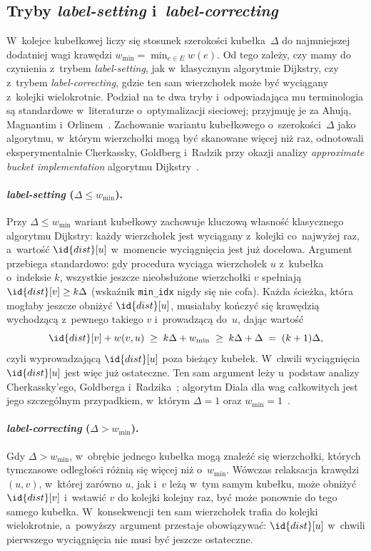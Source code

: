 \subsection{Tryby \emph{label-setting} i~\emph{label-correcting}}
\label{subsec:warianty:bucket:tryby}

W~kolejce kubełkowej liczy się stosunek szerokości
kubełka~$\Delta$ do najmniejszej dodatniej wagi krawędzi
$w_{\min}=\min_{e\in E}w(e)$. Od tego zależy, czy mamy do czynienia z~trybem
\emph{label-setting}, jak w~klasycznym algorytmie
Dijkstry, czy z~trybem \emph{label-correcting},
gdzie ten sam wierzchołek może być wyciągany z~kolejki wielokrotnie.
Podział na te dwa tryby i~odpowiadająca mu terminologia są standardowe
w~literaturze o~optymalizacji sieciowej; przyjmuję je za
Ahują, Magnantim i~Orlinem~\cite{ahuja1993network}.
Zachowanie wariantu kubełkowego o~szerokości~$\Delta$ jako algorytmu,
w~którym wierzchołki mogą być skanowane więcej niż raz, odnotowali
eksperymentalnie Cherkassky, Goldberg i~Radzik przy okazji analizy
\emph{approximate bucket implementation} algorytmu
Dijkstry~\cite{cherkassky1996}.

\paragraph{\emph{label-setting} ($\Delta\le w_{\min}$).}
Przy $\Delta\le w_{\min}$ wariant kubełkowy zachowuje kluczową własność
klasycznego algorytmu Dijkstry: każdy wierzchołek jest wyciągany z~kolejki
co~najwyżej raz, a~wartość $\id{dist}[u]$ w~momencie wyciągnięcia jest już
docelowa. Argument przebiega standardowo: gdy procedura wyciąga wierzchołek
$u$ z~kubełka o~indeksie $k$, wszystkie jeszcze nieobsłużone wierzchołki $v$
spełniają $\id{dist}[v]\ge k\Delta$ (wskaźnik \texttt{min\_idx} nigdy się nie
cofa). Każda ścieżka, która mogłaby jeszcze obniżyć $\id{dist}[u]$, musiałaby kończyć
się krawędzią wychodzącą z~pewnego takiego $v$ i~prowadzącą do~$u$, dając
wartość
\[
\id{dist}[v]+w(v,u)\;\ge\;k\Delta+w_{\min}\;\ge\;k\Delta+\Delta\;=\;(k+1)\Delta,
\]
czyli wyprowadzającą $\id{dist}[u]$ poza bieżący kubełek. W~chwili wyciągnięcia
$\id{dist}[u]$ jest więc już ostateczne. Ten sam argument leży u~podstaw analizy
Cherkassky'ego, Goldberga i~Radzika~\cite{cherkassky1996}; algorytm Diala dla
wag całkowitych jest jego szczególnym przypadkiem, w~którym $\Delta=1$ oraz
$w_{\min}=1$~\cite{dial1969}.

\paragraph{\emph{label-correcting} ($\Delta>w_{\min}$).}
Gdy $\Delta>w_{\min}$, w~obrębie jednego kubełka mogą znaleźć się wierzchołki,
których tymczasowe odległości różnią się więcej niż o~$w_{\min}$. Wówczas
relaksacja krawędzi $(u,v)$, w~której zarówno $u$, jak i~$v$ leżą w~tym samym
kubełku, może obniżyć $\id{dist}[v]$ i~wstawić $v$ do kolejki kolejny raz,
być może ponownie do tego samego kubełka. W~konsekwencji ten sam wierzchołek
trafia do kolejki wielokrotnie, a~powyższy argument przestaje obowiązywać:
$\id{dist}[u]$ w~chwili pierwszego wyciągnięcia nie musi być jeszcze
ostateczne.

